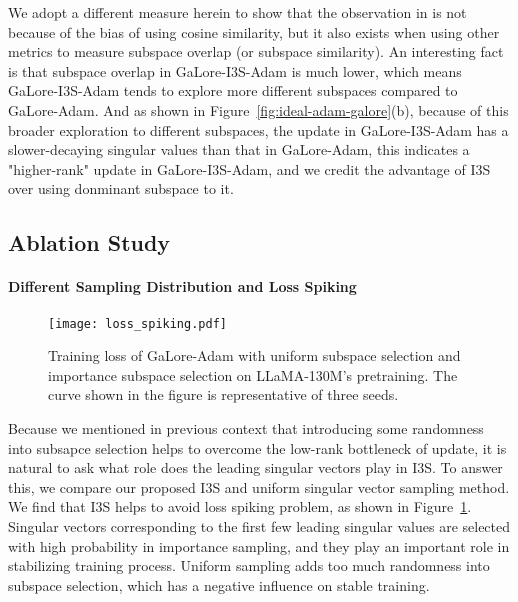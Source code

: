 We adopt a different measure herein to show that the observation in \cite{zhang2024q-galore} is not because of the bias of using cosine similarity, but it also exists when using other metrics to measure subspace overlap (or subspace similarity). An interesting fact is that subspace overlap in GaLore-I3S-Adam is much lower, which means GaLore-I3S-Adam tends to explore more different subspaces compared to GaLore-Adam. And as shown in Figure~\ref{fig:ideal-adam-galore}(b), because of this broader exploration to different subspaces, the update in GaLore-I3S-Adam has a slower-decaying singular values than that in GaLore-Adam, this indicates a "higher-rank" update in GaLore-I3S-Adam, and we credit the advantage of I3S over using donminant subspace to it.

\subsection{Ablation Study}
\paragraph{Different Sampling Distribution and Loss Spiking} 

\begin{figure}[!ht]
    \centering
    \texttt{[image: loss\_spiking.pdf]}
    \caption{Training loss of GaLore-Adam with uniform subspace selection and importance subspace selection on LLaMA-130M's pretraining. The curve shown in the figure is representative of three seeds.}
    \label{fig:loss_spiking}
\end{figure} 


Because we mentioned in previous context that introducing some randomness into subsapce selection helps to overcome the low-rank bottleneck of update, it is natural to ask what role does the leading singular vectors play in I3S. To answer this, we compare our proposed I3S and uniform singular vector sampling method. We find that I3S helps to avoid loss spiking problem, as shown in Figure~\ref{fig:loss_spiking}. Singular vectors corresponding to the first few leading singular values are selected with high probability in importance sampling, and they play an important role in stabilizing training process. Uniform sampling adds too much randomness into subspace selection, which has a negative influence on stable training. 

